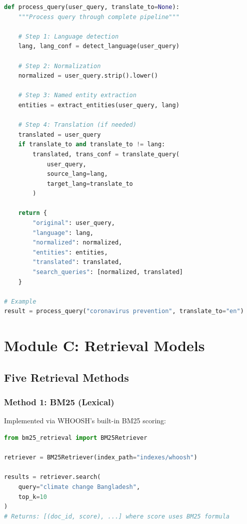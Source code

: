 \documentclass[12pt,a4paper]{report}
\begin{document}
\begin{lstlisting}[language=Python, caption=Full Query Pipeline]
def process_query(user_query, translate_to=None):
    """Process query through complete pipeline"""
    
    # Step 1: Language detection
    lang, lang_conf = detect_language(user_query)
    
    # Step 2: Normalization
    normalized = user_query.strip().lower()
    
    # Step 3: Named entity extraction
    entities = extract_entities(user_query, lang)
    
    # Step 4: Translation (if needed)
    translated = user_query
    if translate_to and translate_to != lang:
        translated, trans_conf = translate_query(
            user_query, 
            source_lang=lang,
            target_lang=translate_to
        )
    
    return {
        "original": user_query,
        "language": lang,
        "normalized": normalized,
        "entities": entities,
        "translated": translated,
        "search_queries": [normalized, translated]
    }

# Example
result = process_query("coronavirus prevention", translate_to="en")
\end{lstlisting}

\section{Module C: Retrieval Models}

\subsection{Five Retrieval Methods}

\subsubsection{Method 1: BM25 (Lexical)}

Implemented via WHOOSH's built-in BM25 scoring:

\begin{lstlisting}[language=Python, caption=BM25 Retrieval]
from bm25_retrieval import BM25Retriever

retriever = BM25Retriever(index_path="indexes/whoosh")

results = retriever.search(
    query="climate change Bangladesh",
    top_k=10
)
# Returns: [(doc_id, score), ...] where score uses BM25 formula
\end{lstlisting}
\end{document}
